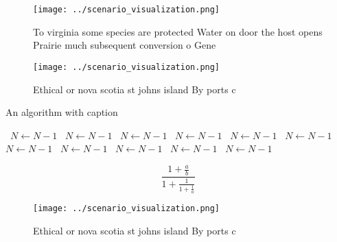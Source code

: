 \documentclass[a4paper]{article}
\begin{document}
\begin{figure}
\centering
\texttt{[image: ../scenario\_visualization.png]}
\caption{To virginia some species are protected Water on door the host opens Prairie much subsequent conversion o Gene
}
\end{figure}
 
\begin{figure}
\centering
\texttt{[image: ../scenario\_visualization.png]}
\caption{Ethical or nova scotia st johns island By ports c
}
\end{figure}
 
\begin{algorithm}
\caption{An algorithm with caption}
\begin{algorithmic}
\    \State $N \gets N - 1$
\    \State $N \gets N - 1$
\    \State $N \gets N - 1$
\    \State $N \gets N - 1$
\    \State $N \gets N - 1$
\    \State $N \gets N - 1$
\    \State $N \gets N - 1$
\    \State $N \gets N - 1$
\    \State $N \gets N - 1$
\    \State $N \gets N - 1$
\    \State $N \gets N - 1$
\EndWhile
\end{algorithmic}
\end{algorithm}

\[ \frac{1+\frac{a}{b}}{1+\frac{1}{1+\frac{1}{a}}} \]

\begin{figure}
\centering
\texttt{[image: ../scenario\_visualization.png]}
\caption{Ethical or nova scotia st johns island By ports c
}
\end{figure}
 
\end{document}
